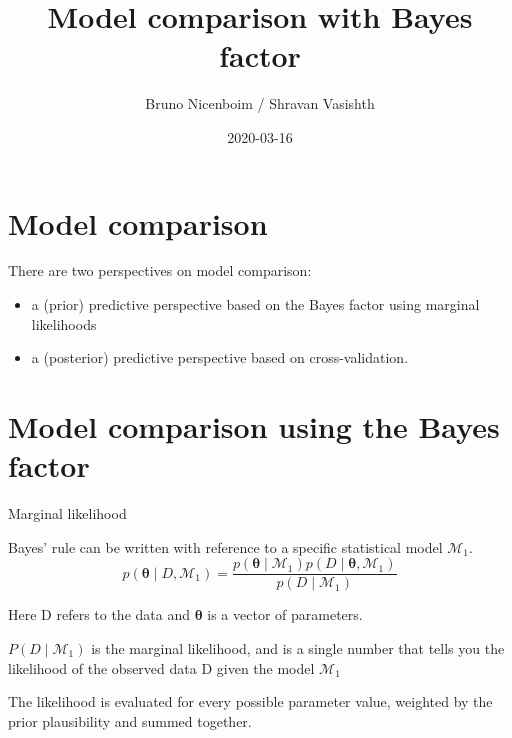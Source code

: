 \documentclass[12pt,ignorenonframetext,aspectratio=169]{beamer}
\title{Model comparison with Bayes factor}
\author{Bruno Nicenboim / Shravan Vasishth}
\date{2020-03-16}
\providecommand{\tightlist}{%
  \setlength{\itemsep}{0pt}\setlength{\parskip}{0pt}}
\begin{document}
\frame{\titlepage}

\begin{frame}
\tableofcontents[hideallsubsections]
\end{frame}
\hypertarget{model-comparison}{%
\section{Model comparison}\label{model-comparison}}

\begin{frame}

There are two perspectives on model comparison:

\begin{itemize}
\tightlist
\item
  a (prior) predictive perspective based on the Bayes factor using marginal likelihoods
\item
  a (posterior) predictive perspective based on cross-validation.
\end{itemize}

\end{frame}

\hypertarget{model-comparison-using-the-bayes-factor}{%
\section{Model comparison using the Bayes factor}\label{model-comparison-using-the-bayes-factor}}

\begin{frame}{Marginal likelihood}
\protect\hypertarget{marginal-likelihood}{}

Bayes' rule can be written with reference to a specific statistical model \(\mathcal{M}_1\).
\begin{equation}
p(\boldsymbol{\theta} \mid D, \mathcal{M}_1) = \frac{p(\boldsymbol{\theta} \mid \mathcal{M}_1) p(D\mid \boldsymbol{\theta}, \mathcal{M}_1) }{p(D\mid \mathcal{M}_1)}
\end{equation}

Here D refers to the data and \(\boldsymbol{\theta}\) is a vector of parameters.

\(P(D\mid \mathcal{M}_1)\) is the marginal likelihood, and is a single number that tells you the likelihood of the observed data D given the model \(\mathcal{M}_1\)

The likelihood is evaluated for every possible parameter value, weighted by the prior plausibility and summed together.

\end{frame}
\end{document}
